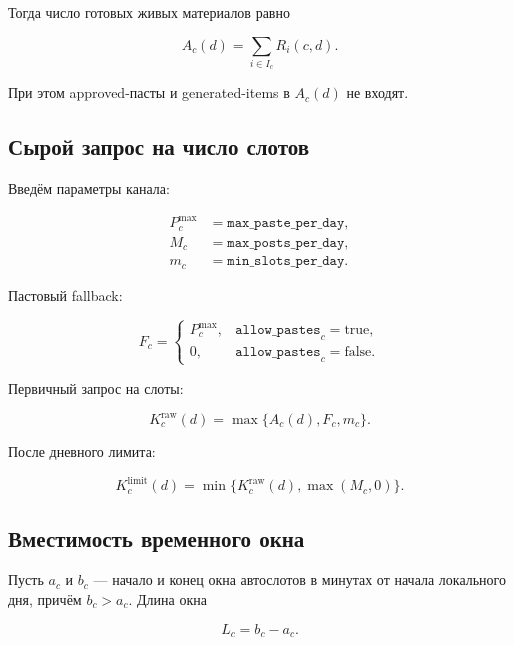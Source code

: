 \documentclass[12pt,a4paper]{article}
\newcommand{\Field}[1]{\texttt{#1}}
\begin{document}
Тогда число готовых живых материалов равно

\begin{equation}
  A_c(d)=\sum_{i\in I_c}R_i(c,d).
  \label{eq:approved-ready}
\end{equation}

При этом approved-пасты и generated-items в $A_c(d)$ не входят.

\subsection{Сырой запрос на число слотов}

Введём параметры канала:

\begin{align*}
  P_c^{\max}&=\Field{max\_paste\_per\_day},\\
  M_c&=\Field{max\_posts\_per\_day},\\
  m_c&=\Field{min\_slots\_per\_day}.
\end{align*}

Пастовый fallback:

\begin{equation}
  F_c=
  \begin{cases}
    P_c^{\max},&\Field{allow\_pastes}_c=\text{true},\\
    0,&\Field{allow\_pastes}_c=\text{false}.
  \end{cases}
  \label{eq:paste-fallback}
\end{equation}

Первичный запрос на слоты:

\begin{equation}
  K_c^{\mathrm{raw}}(d)=\max\{A_c(d),F_c,m_c\}.
  \label{eq:raw-slot-count}
\end{equation}

После дневного лимита:

\begin{equation}
  K_c^{\mathrm{limit}}(d)=
  \min\{K_c^{\mathrm{raw}}(d),\max(M_c,0)\}.
  \label{eq:day-capped-slot-count}
\end{equation}

\subsection{Вместимость временного окна}

Пусть $a_c$ и $b_c$ --- начало и конец окна автослотов в минутах от начала
локального дня, причём $b_c>a_c$. Длина окна

\begin{equation}
  L_c=b_c-a_c.
\end{equation}
\end{document}
